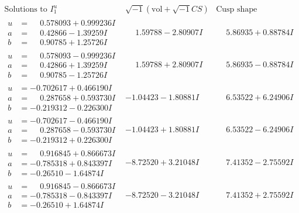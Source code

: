 \documentclass[1p]{elsarticle_modified}
\theoremstyle{definition}
\newcommand{\I}{\sqrt{-1}}
\begin{document}
$$\begin{array}{c|c|c}  
\text{Solutions to }I^u_{1}& \I (\text{vol} + \sqrt{-1}CS) & \text{Cusp shape}\\
 \hline 
\begin{aligned}
u &= \phantom{-}0.578093 + 0.999236 I \\
a &= \phantom{-}0.42866 - 1.39259 I \\
b &= \phantom{-}0.90785 + 1.25726 I\end{aligned}
 & \phantom{-}1.59788 - 2.80907 I & \phantom{-}5.86935 + 0.88784 I \\ \hline\begin{aligned}
u &= \phantom{-}0.578093 - 0.999236 I \\
a &= \phantom{-}0.42866 + 1.39259 I \\
b &= \phantom{-}0.90785 - 1.25726 I\end{aligned}
 & \phantom{-}1.59788 + 2.80907 I & \phantom{-}5.86935 - 0.88784 I \\ \hline\begin{aligned}
u &= -0.702617 + 0.466190 I \\
a &= \phantom{-}0.287658 + 0.593730 I \\
b &= -0.219312 - 0.226300 I\end{aligned}
 & -1.04423 - 1.80881 I & \phantom{-}6.53522 + 6.24906 I \\ \hline\begin{aligned}
u &= -0.702617 - 0.466190 I \\
a &= \phantom{-}0.287658 - 0.593730 I \\
b &= -0.219312 + 0.226300 I\end{aligned}
 & -1.04423 + 1.80881 I & \phantom{-}6.53522 - 6.24906 I \\ \hline\begin{aligned}
u &= \phantom{-}0.916845 + 0.866673 I \\
a &= -0.785318 + 0.843397 I \\
b &= -0.26510 - 1.64874 I\end{aligned}
 & -8.72520 + 3.21048 I & \phantom{-}7.41352 - 2.75592 I \\ \hline\begin{aligned}
u &= \phantom{-}0.916845 - 0.866673 I \\
a &= -0.785318 - 0.843397 I \\
b &= -0.26510 + 1.64874 I\end{aligned}
 & -8.72520 - 3.21048 I & \phantom{-}7.41352 + 2.75592 I \\ \hline\begin{aligned}

\end{aligned}
\end{array}$$
\end{document}
